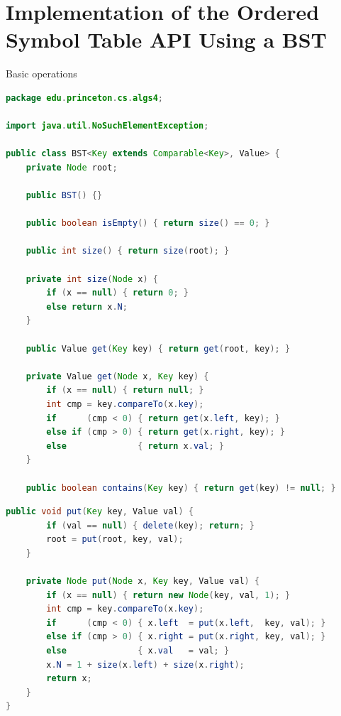 \documentclass[8pt,a4paper,compress]{beamer}
\begin{document}
\section{Implementation of the Ordered Symbol Table API Using a BST}
\begin{frame}[fragile]
\pause

Basic operations

\begin{lstlisting}[language=Java]
package edu.princeton.cs.algs4;

import java.util.NoSuchElementException;

public class BST<Key extends Comparable<Key>, Value> {
    private Node root;
    
    public BST() {}
    
    public boolean isEmpty() { return size() == 0; }

    public int size() { return size(root); }

    private int size(Node x) {
        if (x == null) { return 0; }
        else return x.N;
    }

    public Value get(Key key) { return get(root, key); }

    private Value get(Node x, Key key) {
        if (x == null) { return null; }
        int cmp = key.compareTo(x.key);
        if      (cmp < 0) { return get(x.left, key); }
        else if (cmp > 0) { return get(x.right, key); }
        else              { return x.val; }
    }

    public boolean contains(Key key) { return get(key) != null; }
\end{lstlisting}
\end{frame}

\begin{frame}[fragile]
\pause

\begin{lstlisting}[language=Java]
    public void put(Key key, Value val) {
        if (val == null) { delete(key); return; }
        root = put(root, key, val);
    }

    private Node put(Node x, Key key, Value val) {
        if (x == null) { return new Node(key, val, 1); }
        int cmp = key.compareTo(x.key);
        if      (cmp < 0) { x.left  = put(x.left,  key, val); }
        else if (cmp > 0) { x.right = put(x.right, key, val); }
        else              { x.val   = val; }
        x.N = 1 + size(x.left) + size(x.right);
        return x;
    }
}
\end{lstlisting}
\end{frame}
\end{document}
